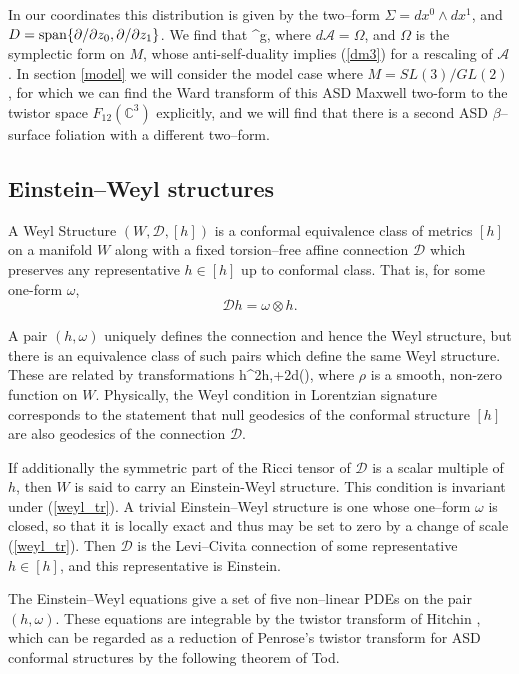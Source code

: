 In our coordinates this distribution is given by the two--form $\Sigma=dx^0\wedge dx^1$, and ${D}=\mathrm{span}\{\partial/\partial z_0,\partial/\partial z_1\}$. We find that
\be
\label{beta_eq}
^g\nabla{}\otimes \Sigma,
\ee
where $d\mathcal{A}=\Omega$, and $\Omega$ is the symplectic form on $M$, whose anti-self-duality implies (\ref{dm3}) for a rescaling of $\mathcal{A}$. In section \ref{model} we will consider the model case where $M=SL(3)/GL(2)$, for which we can find the Ward transform of this ASD Maxwell two-form to the twistor space $F_{12}(\mathbb{C}^3)$
explicitly, and we will find that there is a second ASD $\beta$--surface foliation with a different two--form.


\subsection{Einstein--Weyl structures}
\begin{defi}
A Weyl Structure $(W,\mathcal{D},[h])$ is a conformal equivalence class of metrics $[h]$ on a manifold $W$ along with a fixed torsion--free affine connection $\mathcal{D}$ which preserves any representative $h\in[h]$ up to conformal class. That is, for some one-form $\omega$,
\[
\mathcal{D}h=\omega\otimes h.
\]
\end{defi}
A pair $(h,\omega)$ uniquely defines the connection and hence the Weyl structure, but there is an equivalence class of such pairs which define the same Weyl structure. These are related by transformations
\be
\label{weyl_tr}
h\rightarrow \rho^2h,\quad\omega\rightarrow\omega+2d(\rho),
\ee
where $\rho$ is a smooth, non-zero function on $W$. 
Physically, the Weyl condition in Lorentzian signature corresponds to the statement that null geodesics of the conformal structure $[h]$ are also geodesics of the connection $\mathcal{D}$.

If additionally the symmetric part of the Ricci tensor of $\mathcal{D}$ is a scalar multiple of $h$, then $W$ is said to carry an Einstein-Weyl structure.
This condition is invariant under (\ref{weyl_tr}). A trivial Einstein--Weyl structure is one whose one--form $\omega$ is closed, so that it is locally exact and thus may be set to zero by a change of scale (\ref{weyl_tr}). Then $\mathcal{D}$ is the Levi--Civita connection of some representative $h\in[h]$, and this representative is Einstein.

The Einstein--Weyl equations
give a set of five non--linear PDEs on the pair $(h, \omega)$. These equations
are integrable by the twistor transform of Hitchin \cite{hitchin}, which 
 can be regarded as a reduction of Penrose's twistor transform \cite{penrose} for ASD conformal structures by the following theorem of Tod.
 
